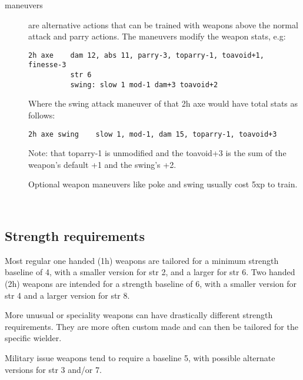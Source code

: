 \begin{description}
\item[maneuvers] are alternative actions that can be trained with weapons above the normal attack and parry actions. The maneuvers modify the weapon stats, e.g:
\begin{verbatim}
2h axe    dam 12, abs 11, parry-3, toparry-1, toavoid+1, finesse-3
          str 6
          swing: slow 1 mod-1 dam+3 toavoid+2
\end{verbatim}
Where the swing attack maneuver of that 2h axe would have total stats as follows:
\begin{verbatim}
2h axe swing    slow 1, mod-1, dam 15, toparry-1, toavoid+3
\end{verbatim}
Note: that toparry-1 is unmodified and the toavoid+3 is the sum of the weapon's default +1 and the swing's +2.

Optional weapon maneuvers like poke and swing usually cost 5xp to train.

\end{description}

\

\subsection*{Strength requirements}
Most regular one handed (1h) weapons are tailored for a minimum strength baseline of 4, with a smaller version for str 2, and a larger for str 6. Two handed (2h) weapons are intended for a strength baseline of 6, with a smaller version for str 4 and a larger version for str 8.

More unusual or speciality weapons can have drastically different strength requirements. They are more often custom made and can then be tailored for the specific wielder.

Military issue weapons tend to require a baseline 5, with possible alternate versions for str 3 and/or 7.


%
%



